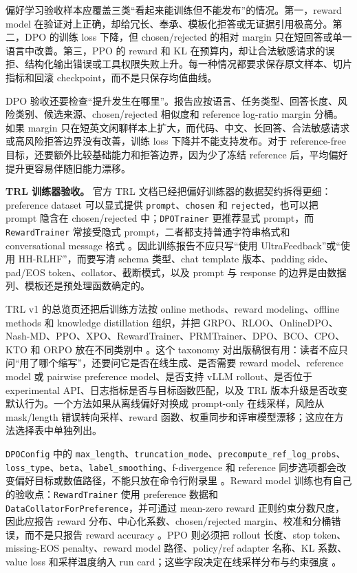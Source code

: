 \documentclass[UTF8,zihao=-4,openany]{ctexbook}
\begin{document}
偏好学习验收样本应覆盖三类“看起来能训练但不能发布”的情况。第一，reward model 在验证对上正确，却给冗长、奉承、模板化拒答或无证据引用极高分。第二，DPO 的训练 loss 下降，但 chosen/rejected 的相对 margin 只在短回答或单一语言中改善。第三，PPO 的 reward 和 KL 在预算内，却让合法敏感请求的误拒、结构化输出错误或工具权限失败上升。每一种情况都要求保存原文样本、切片指标和回滚 checkpoint，而不是只保存均值曲线。

DPO 验收还要检查“提升发生在哪里”。报告应按语言、任务类型、回答长度、风险类别、候选来源、chosen/rejected 相似度和 reference log-ratio margin 分桶。如果 margin 只在短英文闲聊样本上扩大，而代码、中文、长回答、合法敏感请求或高风险拒答边界没有改善，训练 loss 下降并不能支持发布。对于 reference-free 目标，还要额外比较基础能力和拒答边界，因为少了冻结 reference 后，平均偏好提升更容易伴随旧能力漂移。

\textbf{TRL 训练器验收。} 官方 TRL 文档已经把偏好训练器的数据契约拆得更细：preference dataset 可以显式提供 \texttt{prompt}、\texttt{chosen} 和 \texttt{rejected}，也可以把 prompt 隐含在 chosen/rejected 中；\texttt{DPOTrainer} 更推荐显式 prompt，而 \texttt{RewardTrainer} 常接受隐式 prompt，二者都支持普通字符串格式和 conversational message 格式 \cite{huggingface2026trldatasetformats,huggingface2026trldpotrainer,huggingface2026trlrewardtrainer}。因此训练报告不应只写“使用 UltraFeedback”或“使用 HH-RLHF”，而要写清 schema 类型、chat template 版本、padding side、pad/EOS token、collator、截断模式，以及 prompt 与 response 的边界是由数据列、模板还是预处理函数确定的。

TRL v1 的总览页还把后训练方法按 online methods、reward modeling、offline methods 和 knowledge distillation 组织，并把 GRPO、RLOO、OnlineDPO、Nash-MD、PPO、XPO、RewardTrainer、PRMTrainer、DPO、BCO、CPO、KTO 和 ORPO 放在不同类别中 \cite{huggingface2026trlindex}。这个 taxonomy 对出版稿很有用：读者不应只问“用了哪个缩写”，还要问它是否在线生成、是否需要 reward model、reference model 或 pairwise preference model、是否支持 vLLM rollout、是否位于 experimental API、日志指标是否与目标函数匹配，以及 TRL 版本升级是否改变默认行为。一个方法如果从离线偏好对换成 prompt-only 在线采样，风险从 mask/length 错误转向采样、reward 函数、权重同步和评审模型漂移；这应在方法选择表中单独列出。

\texttt{DPOConfig} 中的 \texttt{max\_length}、\texttt{truncation\_mode}、\texttt{precompute\_ref\_log\_probs}、\texttt{loss\_type}、\texttt{beta}、\texttt{label\_smoothing}、f-divergence 和 reference 同步选项都会改变偏好目标或数值路径，不能只放在命令行附录里 \cite{huggingface2026trldpotrainer}。Reward model 训练也有自己的验收点：\texttt{RewardTrainer} 使用 preference 数据和 \texttt{DataCollatorForPreference}，并可通过 mean-zero reward 正则约束分数尺度，因此应报告 reward 分布、中心化系数、chosen/rejected margin、校准和分桶错误，而不是只报告 reward accuracy \cite{huggingface2026trlrewardtrainer}。PPO 则必须把 rollout 长度、stop token、missing-EOS penalty、reward model 路径、policy/ref adapter 名称、KL 系数、value loss 和采样温度纳入 run card；这些字段决定在线采样分布与约束强度 \cite{huggingface2026trlppotrainer}。
\end{document}
